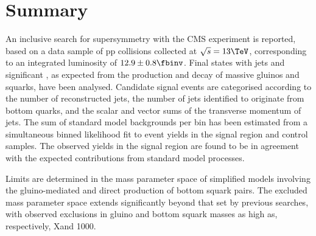 \section{Summary}
\label{sec:summary}

An inclusive search for supersymmetry with the CMS experiment is
reported, based on a data sample of pp collisions collected at
$\sqrt{s} = 13\TeV$, corresponding to an integrated luminosity of $12.9
\pm 0.8 \fbinv$. Final states with jets and significant \ptvecmiss, as
expected from the production and decay of massive gluinos and squarks,
have been analysed. Candidate signal events are categorised according
to the number of reconstructed jets, the number of jets identified to
originate from bottom quarks, and the scalar and vector sums of the
transverse momentum of jets. The sum of standard model backgrounds per
bin has been estimated from a simultaneous binned likelihood fit to
event yields in the signal region and control samples. The observed
yields in the signal region are found to be in agreement with the
expected contributions from standard model processes. 

Limits are determined in the mass parameter space of simplified models
involving the gluino-mediated and direct production of bottom squark
pairs. The excluded mass parameter space extends significantly beyond
that set by previous searches, with observed exclusions in gluino and
bottom squark masses as high as, respectively, X\gev and 1000\gev.


